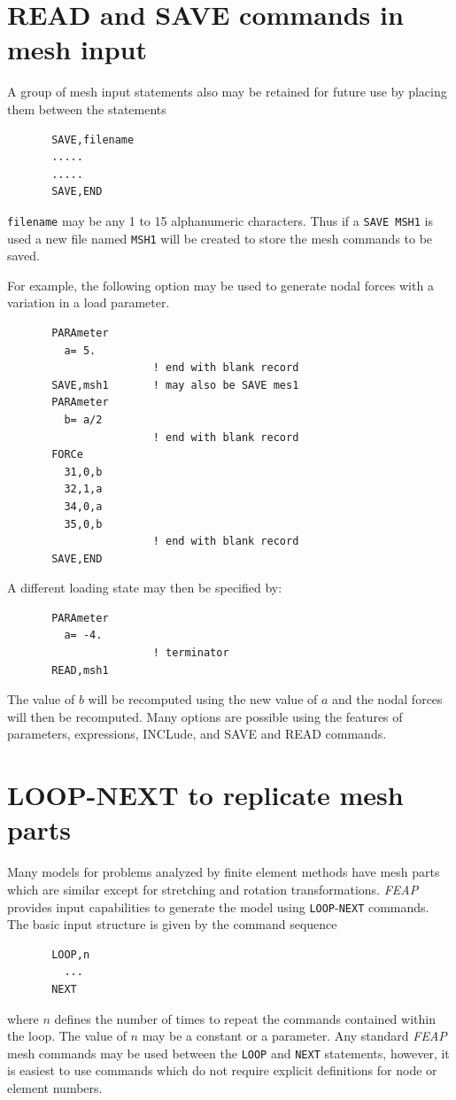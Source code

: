 \section{READ and SAVE commands in mesh input}
\label{save}

A group of mesh input statements also may be retained for future use by
placing them between the statements
\begin{verbatim}
       SAVE,filename
       .....
       .....
       SAVE,END
\end{verbatim}
{\tt filename} may be any 1 to 15 alphanumeric characters. Thus if
a {\tt SAVE MSH1} is used a new file named {\tt MSH1} will be
created to store the mesh commands to be saved.

For example, the following option may be used to generate nodal
forces with a variation in a load parameter.
\begin{verbatim}
       PARAmeter
         a= 5.
                       ! end with blank record
       SAVE,msh1       ! may also be SAVE mes1
       PARAmeter
         b= a/2
                       ! end with blank record
       FORCe
         31,0,b
         32,1,a
         34,0,a
         35,0,b
                       ! end with blank record
       SAVE,END
\end{verbatim}
A different loading state may then be specified by:
\begin{verbatim}
       PARAmeter
         a= -4.
                       ! terminator
       READ,msh1
\end{verbatim}
The value of $b$ will be recomputed using the new value of $a$
and the nodal forces will then be recomputed.  Many options are
possible using the features of parameters, expressions, INCLude, and SAVE
and READ commands.

\section{LOOP-NEXT to replicate mesh parts}
\label{mloop}

Many models for problems analyzed by finite element methods have mesh parts
which are similar except for stretching and rotation transformations.
\textsl{FEAP} provides input capabilities to generate the model using
\texttt{LOOP}-\texttt{NEXT} commands.  The basic input structure is given
by the command sequence
\begin{verbatim}
       LOOP,n
         ...
       NEXT
\end{verbatim}
where $n$ defines the number of times to repeat the commands contained
within the loop.  The value of $n$ may be a constant or a parameter.
Any standard \textsl{FEAP} mesh commands may be used between the \texttt{LOOP}
and \texttt{NEXT} statements, however, it is easiest to use commands which do
not require explicit definitions for node or element numbers.

